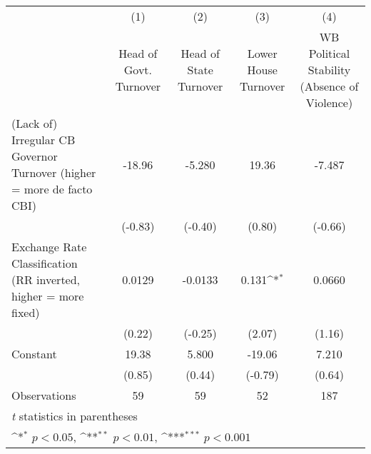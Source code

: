 {
\def\sym#1{\ifmmode^{#1}\else\(^{#1}\)\fi}
\begin{tabular}{l*{4}{c}}
\hline\hline
                &\multicolumn{1}{c}{(1)}&\multicolumn{1}{c}{(2)}&\multicolumn{1}{c}{(3)}&\multicolumn{1}{c}{(4)}\\
                &\multicolumn{1}{c}{Head of Govt. Turnover}&\multicolumn{1}{c}{Head of State Turnover}&\multicolumn{1}{c}{Lower House Turnover}&\multicolumn{1}{c}{WB Political Stability (Absence of Violence)}\\
\hline
(Lack of) Irregular CB Governor Turnover (higher = more de facto CBI)&   -18.96         &   -5.280         &    19.36         &   -7.487         \\
                &  (-0.83)         &  (-0.40)         &   (0.80)         &  (-0.66)         \\
[1em]
Exchange Rate Classification (RR inverted, higher = more fixed)&   0.0129         &  -0.0133         &    0.131\sym{*}  &   0.0660         \\
                &   (0.22)         &  (-0.25)         &   (2.07)         &   (1.16)         \\
[1em]
Constant        &    19.38         &    5.800         &   -19.06         &    7.210         \\
                &   (0.85)         &   (0.44)         &  (-0.79)         &   (0.64)         \\
\hline
Observations    &       59         &       59         &       52         &      187         \\
\hline\hline
\multicolumn{5}{l}{\footnotesize \textit{t} statistics in parentheses}\\
\multicolumn{5}{l}{\footnotesize \sym{*} \(p<0.05\), \sym{**} \(p<0.01\), \sym{***} \(p<0.001\)}\\
\end{tabular}
}

